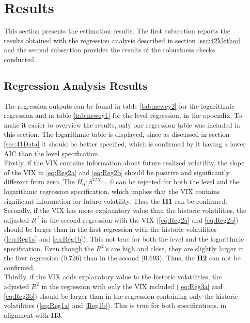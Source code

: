 
\section{Results}\label{sec:5Results}

This section presents the estimation results. The first subsection reports the results obtained with the regression analysis described in section \ref{sec:42Method} and the second subsection provides the results of the robustness checks conducted. 

\subsection{Regression Analysis Results}\label{sec:51Regression}
The regression outputs can be found in table \ref{tab:newey2} for the logarithmic regression and in table \ref{tab:newey1} for the level regression, in the appendix. To make it easier to overview the results, only one regression table was included in this section. The logarithmic table is displayed, since as discussed in section \ref{sec:41Data} it should be better specified, which is confirmed by it having a lower AIC than the level specification.\\
Firstly, if the VIX contains information about future realized volatility, the slope of the VIX in \ref{eq:Reg2a} and \ref{eq:Reg2b} should be positive and significantly different from zero. The $H_{0}: \beta^{VIX} = 0$ can be rejected for both the level and the logarithmic regression specification, which implies that the VIX contains significant information for future volatility. Thus the \textbf{\ac{H1}} can be confirmed.\\
Secondly, if the VIX has more explanatory value than the historic volatilities, the adjusted $R^{2}$ in the second regression with the \ac{VIX} (\ref{eq:Reg2a} and \ref{eq:Reg2b}) should be larger than in the first regression with the historic volatilities (\ref{eq:Reg1a} and \ref{eq:Reg1b}). This not true for both the level and the logarithmic specification. Even though the $R^{2}$'s are high and close, they are slightly larger in the first regression ($0.726$) than in the second ($0.693$). Thus, the \textbf{\ac{H2}} can not be confirmed.\\
Thirdly, if the VIX adds explanatory value to the historic volatilities, the adjusted $R^{2}$ in the regression with only the VIX included (\ref{eq:Reg3a} and \ref{eq:Reg3b}) should be larger than in the regression containing only the historic volatilities (\ref{eq:Reg1a} and \ref{Reg1b}). This is true for both specifications, in alignment with \textbf{\ac{H3}}.\\
